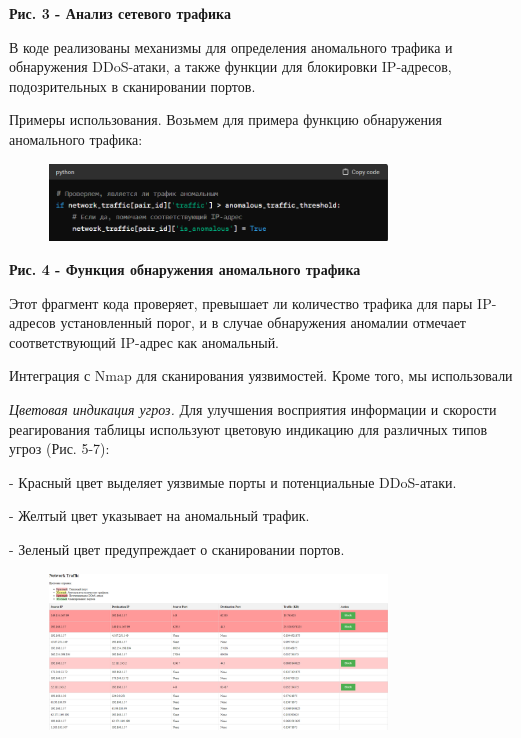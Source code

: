 \textbf{Рис. 3 - Анализ сетевого трафика}

В коде реализованы механизмы для определения аномального трафика и
обнаружения DDoS-атаки, а также функции для блокировки IP-адресов,
подозрительных в сканировании портов.

Примеры использования. Возьмем для примера функцию обнаружения
аномального трафика:

\begin{figure}[H]
	\centering
	\includegraphics[width=0.8\textwidth]{assets/50}
	\caption*{}
\end{figure}

\textbf{Рис. 4 - Функция обнаружения аномального трафика}

Этот фрагмент кода проверяет, превышает ли количество трафика для пары
IP-адресов установленный порог, и в случае обнаружения аномалии отмечает
соответствующий IP-адрес как аномальный.

Интеграция с Nmap для сканирования уязвимостей. Кроме того, мы
использовали

\emph{Цветовая индикация угроз.} Для улучшения восприятия информации и
скорости реагирования таблицы используют цветовую индикацию для
различных типов угроз (Рис. 5-7):

- Красный цвет выделяет уязвимые порты и потенциальные DDoS-атаки.

- Желтый цвет указывает на аномальный трафик.

- Зеленый цвет предупреждает о сканировании портов.

\begin{figure}[H]
	\centering
	\includegraphics[width=0.8\textwidth]{assets/51}
	\caption*{}
\end{figure}

